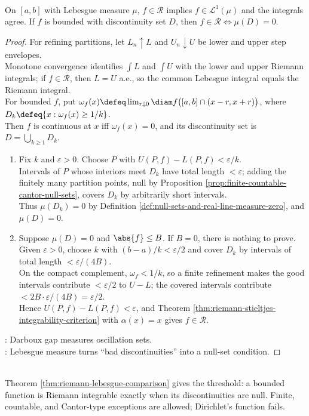 \begin{theorem} \label{thm:riemann-lebesgue-comparison} \\
On $[a,b]$ with Lebesgue measure $\mu$, $f\in\mathcal{R}$ implies $f\in\mathscr{L}^1(\mu)$ and the integrals agree. If $f$ is bounded with discontinuity set $D$, then $f\in\mathcal{R}\iff\mu(D)=0$.
\begin{proof}
For refining partitions, let $L_n\uparrow L$ and $U_n\downarrow U$ be lower and upper step envelopes.\\
Monotone convergence identifies $\int L$ and $\int U$ with the lower and upper Riemann integrals; if $f\in\mathcal{R}$, then $L=U$ a.e., so the common Lebesgue integral equals the Riemann integral.\\
For bounded $f$, put $\omega_f(x)\defeq \lim_{r\downarrow0}\diam f\bigl([a,b]\cap(x-r,x+r)\bigr)$, where $D_k\defeq\{x:\omega_f(x)\geq1/k\}$.\\
Then $f$ is continuous at $x$ iff $\omega_f(x)=0$, and its discontinuity set is $D=\bigcup_{k\geq1}D_k$.
\begin{enumerate}[label=\roman*.]
\setlength{\itemsep}{0pt}
\item[$(\Rightarrow)$] Fix $k$ and $\varepsilon>0$. Choose $P$ with $U(P,f)-L(P,f)<\varepsilon/k$.\\
Intervals of $P$ whose interiors meet $D_k$ have total length $<\varepsilon$; adding the finitely many partition points, null by Proposition \ref{prop:finite-countable-cantor-null-sets}, covers $D_k$ by arbitrarily short intervals.\\
Thus $\mu(D_k)=0$ by Definition \ref{def:null-sets-and-real-line-measure-zero}, and $\mu(D)=0$.
\item[$(\Leftarrow)$] Suppose $\mu(D)=0$ and $\abs{f}\leq B$. If $B=0$, there is nothing to prove. Given $\varepsilon>0$, choose $k$ with $(b-a)/k<\varepsilon/2$ and cover $D_k$ by intervals of total length $<\varepsilon/(4B)$.\\
On the compact complement, $\omega_f<1/k$, so a finite refinement makes the good intervals contribute $<\varepsilon/2$ to $U-L$; the covered intervals contribute $<2B\cdot\varepsilon/(4B)=\varepsilon/2$.\\
Hence $U(P,f)-L(P,f)<\varepsilon$, and Theorem \ref{thm:riemann-stieltjes-integrability-criterion} with $\alpha(x)=x$ gives $f\in\mathcal{R}$.
\end{enumerate}
: Darboux gap measures oscillation sets.\\
: Lebesgue measure turns ``bad discontinuities'' into a null-set condition.
\end{proof}
\end{theorem}

\begin{perspective} \label{per:lebesgue-criterion-riemann-roadmap} \\
Theorem \ref{thm:riemann-lebesgue-comparison} gives the threshold: a bounded function is Riemann integrable exactly when its discontinuities are null. Finite, countable, and Cantor-type exceptions are allowed; Dirichlet's function fails.
\end{perspective}
